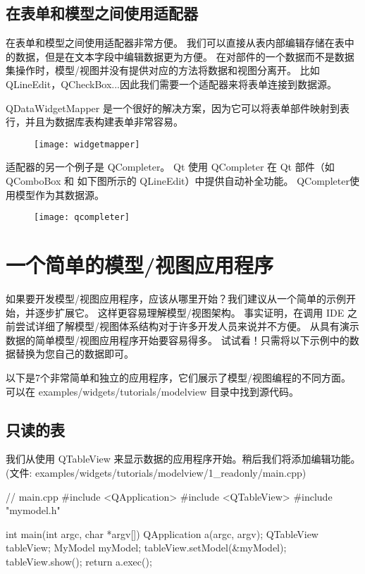 \subsection{在表单和模型之间使用适配器}

在表单和模型之间使用适配器非常方便。
我们可以直接从表内部编辑存储在表中的数据，但是在文本字段中编辑数据更为方便。
在对部件的一个数据而不是数据集操作时，模型/视图并没有提供对应的方法将数据和视图分离开。
比如 QLineEdit，QCheckBox...因此我们需要一个适配器来将表单连接到数据源。

QDataWidgetMapper 是一个很好的解决方案，因为它可以将表单部件映射到表行，并且为数据库表构建表单非常容易。

\begin{figure}[hbt!]  
\texttt{[image: widgetmapper]}
\end{figure}

适配器的另一个例子是 QCompleter。
Qt 使用 QCompleter 在 Qt 部件（如 QComboBox 和 如下图所示的 QLineEdit）中提供自动补全功能。
QCompleter使用模型作为其数据源。
	
\begin{figure}[hbt!]  
\texttt{[image: qcompleter]}
\end{figure}

\section{一个简单的模型/视图应用程序}

如果要开发模型/视图应用程序，应该从哪里开始？我们建议从一个简单的示例开始，并逐步扩展它。
这样更容易理解模型/视图架构。
事实证明，在调用 IDE 之前尝试详细了解模型/视图体系结构对于许多开发人员来说并不方便。
从具有演示数据的简单模型/视图应用程序开始要容易得多。
试试看！只需将以下示例中的数据替换为您自己的数据即可。

以下是7个非常简单和独立的应用程序，它们展示了模型/视图编程的不同方面。
可以在 examples/widgets/tutorials/modelview 目录中找到源代码。

\subsection{只读的表}

我们从使用 QTableView 来显示数据的应用程序开始。稍后我们将添加编辑功能。
(文件: examples/widgets/tutorials/modelview/1\_readonly/main.cpp)

\begin{cppcode}
// main.cpp
#include <QApplication>
#include <QTableView>
#include "mymodel.h"
	
int main(int argc, char *argv[])
{
	QApplication a(argc, argv);
	QTableView tableView;
	MyModel myModel;
	tableView.setModel(&myModel);
	tableView.show();
	return a.exec();
}
\end{cppcode}

